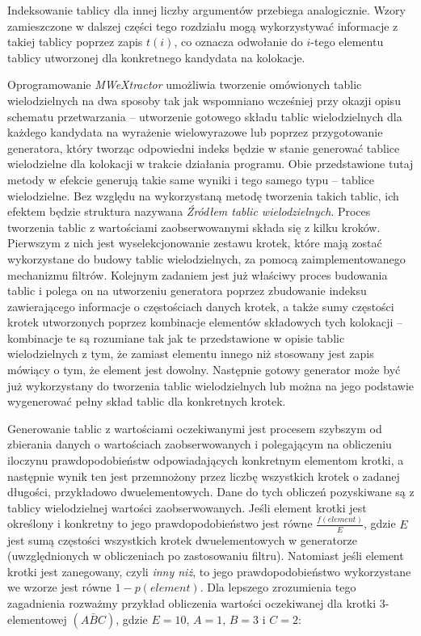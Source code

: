 \documentclass[11pt,a4paper]{llncs}
\begin{document}
Indeksowanie tablicy dla innej liczby argumentów przebiega analogicznie.
Wzory zamieszczone w dalszej części tego rozdziału mogą wykorzystywać informacje z takiej tablicy poprzez zapis $ t(i) $, co oznacza odwołanie do $i$-tego elementu tablicy utworzonej dla konkretnego kandydata na kolokacje.


Oprogramowanie \emph{MWeXtractor} umożliwia tworzenie omówionych tablic wielodzielnych na dwa sposoby tak jak wspomniano wcześniej przy okazji opisu schematu przetwarzania -- utworzenie gotowego składu tablic wielodzielnych dla każdego kandydata na wyrażenie wielowyrazowe lub poprzez przygotowanie generatora, który tworząc odpowiedni indeks będzie w stanie generować tablice wielodzielne dla kolokacji w trakcie działania programu.
Obie przedstawione tutaj metody w efekcie generują takie same wyniki i tego samego typu -- tablice wielodzielne.
Bez względu na wykorzystaną metodę tworzenia takich tablic, ich efektem będzie struktura nazywana \emph{Źródłem tablic wielodzielnych}.
Proces tworzenia tablic z wartościami zaobserwowanymi składa się z kilku kroków.
Pierwszym z nich jest wyselekcjonowanie zestawu krotek, które mają zostać wykorzystane do budowy tablic wielodzielnych, za pomocą zaimplementowanego mechanizmu filtrów.
Kolejnym zadaniem jest już właściwy proces budowania tablic i polega on na utworzeniu generatora poprzez zbudowanie indeksu zawierającego informacje o częstościach danych krotek, a także sumy częstości krotek utworzonych poprzez kombinacje elementów składowych tych kolokacji -- kombinacje te są rozumiane tak jak te przedstawione w opisie tablic wielodzielnych z tym, że zamiast elementu innego niż stosowany jest zapis mówiący o tym, że element jest dowolny.
Następnie gotowy generator może być już wykorzystany do tworzenia tablic wielodzielnych lub można na jego podstawie wygenerować pełny skład tablic dla konkretnych krotek.
\par
Generowanie tablic z wartościami oczekiwanymi jest procesem szybszym od zbierania danych o wartościach zaobserwowanych i polegającym na obliczeniu iloczynu prawdopodobieństw odpowiadających konkretnym elementom krotki, a następnie wynik ten jest przemnożony przez liczbę wszystkich krotek o zadanej długości, przykładowo dwuelementowych.
Dane do tych obliczeń pozyskiwane są z tablicy wielodzielnej wartości zaobserwowanych.
Jeśli element krotki jest określony i konkretny to jego prawdopodobieństwo jest równe $ \frac{f(element)}{E} $, gdzie $ E $ jest sumą częstości wszystkich krotek dwuelementowych w generatorze (uwzględnionych w obliczeniach po zastosowaniu filtru).
Natomiast jeśli element krotki jest zanegowany, czyli \emph{inny niż}, to jego prawdopodobieństwo wykorzystane we wzorze jest równe $ 1 - p(element) $.
Dla lepszego zrozumienia tego zagadnienia rozważmy przykład obliczenia wartości oczekiwanej dla krotki 3-elementowej $ (A \bar{B} C) $, gdzie $ E = 10 $, $ A = 1 $, $ B = 3 $ i $ C = 2 $:
\end{document}
